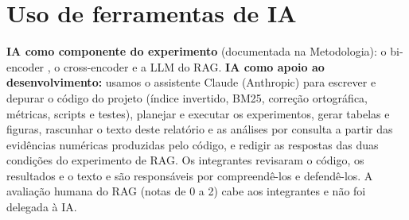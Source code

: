 \section{Uso de ferramentas de IA}
\textbf{IA como componente do experimento} (documentada na Metodologia): o bi-encoder \texttt{\EncName}, o cross-encoder \texttt{\CEName} e a LLM do RAG. \textbf{IA como apoio ao desenvolvimento:} usamos o assistente Claude (Anthropic) para escrever e depurar o código do projeto (índice invertido, BM25, correção ortográfica, métricas, scripts e testes), planejar e executar os experimentos, gerar tabelas e figuras, rascunhar o texto deste relatório e as análises por consulta a partir das evidências numéricas produzidas pelo código, e redigir as respostas das duas condições do experimento de RAG. Os integrantes revisaram o código, os resultados e o texto e são responsáveis por compreendê-los e defendê-los. A avaliação humana do RAG (notas de 0 a 2) cabe aos integrantes e não foi delegada à IA.
